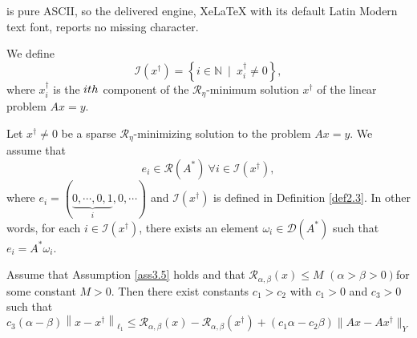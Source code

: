 \documentclass[10pt,a4paper]{amsart}
\begin{document}
is pure ASCII, so the delivered engine, XeLaTeX with its default Latin Modern text font, reports no missing character.
\begin{definition}\label{def2.3}
    We define
    \begin{equation*}
        \mathcal{I}(x^{\dagger})=\left\{i\in\mathbb{N}\ \mid\ x_{i}^{\dagger}\neq 0\right\},
    \end{equation*}
    where $x_{i}^{\dagger}$ is the $i{\rm th}$ component of the $\mathcal{R}_{\eta}$-minimum solution $x^{\dagger}$ of the linear problem $Ax=y$.
\end{definition}

\begin{assumption}\label{ass3.5}
    Let $x^{\dagger}\neq 0$ be a sparse $\mathcal{R}_{\eta}$-minimizing solution to the problem $Ax=y$. We assume that
    \begin{equation*}
        e_{i}\in\mathcal{R}\left(A^{*}\right)\ \forall i\in\mathcal{I}(x^{\dagger}),
    \end{equation*}
    where $e_{i}=(\underbrace{0,\cdots,0,1}_{i},0,\cdots)$ and $\mathcal{I}\left(x^{\dagger}\right)$ is defined in Definition \ref{def2.3}. In other words, for each $i\in\mathcal{I}\left(x^{\dagger}\right)$, there exists an element $\omega_{i}\in\mathcal{D}\left(A^{*}\right)$ such that $e_{i}=A^{*}\omega_{i}$.
\end{assumption}

\begin{lemma}\label{lem3.6}
    Assume that Assumption \ref{ass3.5} holds and that $\mathcal{R}_{\alpha,\beta}\left(x\right)\leq M$ $\left(\alpha>\beta>0\right)$for some constant $M>0$. Then there exist constants $c_{1}>c_{2}$ with $c_{1}>0$ and $c_{3}>0$ such that
    \begin{equation}\label{equ3.4}
        c_{3}\left(\alpha-\beta\right)\left\|x-x^{\dagger}\right\|_{\ell_{1}} \leq\mathcal{R}_{\alpha,\beta}\left(x\right)-\mathcal{R}_{\alpha,\beta}\left(x^{\dagger}\right) +\left(c_{1}\alpha-c_{2}\beta\right)\|Ax-Ax^{\dagger}\|_{Y}
    \end{equation}
\end{lemma}
\end{document}
